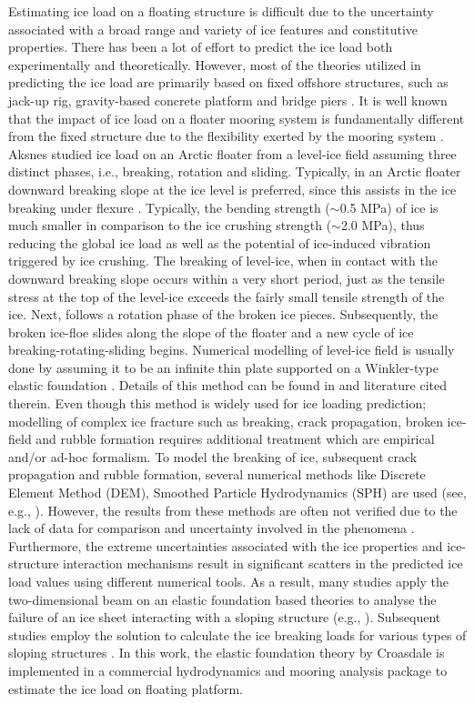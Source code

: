 \documentclass[review]{elsarticle}
\begin{document}
Estimating ice load on a floating structure is difficult due to the uncertainty associated with a broad range and variety of ice features and constitutive properties. There has been a lot of effort to predict the ice load both experimentally and theoretically. 
However, most of the theories utilized in predicting the ice load are primarily based on fixed offshore structures, such as jack-up rig, gravity-based concrete platform and bridge piers \cite{ISO_2010}. It is well known that the impact of ice load on a floater mooring system is fundamentally different from the fixed structure due to the flexibility exerted by the mooring system \cite{Lu_2014,Lu_2015}. Aksnes \cite{Aksnes_2010,Aksnes_2011} studied ice load on an Arctic floater from a level-ice field assuming three distinct phases, i.e., breaking, rotation and sliding. Typically, in an Arctic floater downward breaking slope at the ice level is preferred, since this assists in the ice breaking under flexure \cite{Lohne_2012}. Typically, the bending strength ($\sim$0.5 MPa) of ice is much smaller in comparison to the ice crushing strength ($\sim$2.0 MPa), thus reducing the global ice load as well as the potential of ice-induced vibration triggered by ice crushing. The breaking of level-ice, when in contact with the downward breaking slope occurs within a very short period, just as the tensile stress at the top of the level-ice exceeds the fairly small tensile strength of the ice. Next, follows a rotation phase of the broken ice pieces. Subsequently, the broken ice-floe slides along the slope of the floater and a new cycle of ice breaking-rotating-sliding begins. Numerical modelling of level-ice field is usually done by assuming it to be an infinite thin plate supported on a Winkler-type elastic foundation \cite{Nevel_1958,Nevel_1961}. Details of this method can be found in \cite{Kerr_1976,Squire_1996} and literature cited therein. Even though this method is widely used for ice loading prediction; modelling of complex ice fracture such as breaking, crack propagation, broken ice-field and rubble formation requires additional treatment which are empirical and/or ad-hoc formalism. To model the breaking of ice, subsequent crack propagation and rubble formation, several numerical methods like Discrete Element Method (DEM), Smoothed Particle Hydrodynamics (SPH) are used (see, e.g., \cite{Ji_2013,Das_2015}). However, the results from these methods are often not verified due to the lack of data for comparison and uncertainty involved in the phenomena \cite{Ji_2013}. Furthermore, the extreme uncertainties associated with the ice properties and ice-structure interaction mechanisms result in significant scatters in the predicted ice load values using different numerical tools. As a result, many studies apply the two-dimensional beam on an elastic foundation based theories to analyse the failure of an ice sheet interacting with a sloping structure (e.g., \cite{Lu_2014, Croasdale_1994}). Subsequent studies employ the solution to calculate the ice breaking loads for various types of sloping structures \cite{Kotras_1983, Lubbad_2011}. In this work, the elastic foundation theory by Croasdale \cite{Croasdale_1994} is implemented in a commercial hydrodynamics and mooring analysis package to estimate the ice load on floating platform. 
\end{document}
